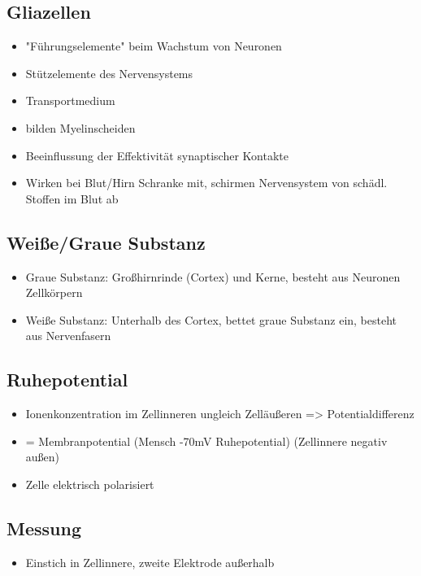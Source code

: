 \documentclass[a4paper,10pt,oneside]{article}
\begin{document}
\subsection{Gliazellen}
\begin{itemize}
	\item "Führungselemente" beim Wachstum von Neuronen
	\item Stützelemente des Nervensystems
	\item Transportmedium 
	\item bilden Myelinscheiden
	\item Beeinflussung der Effektivität synaptischer Kontakte
	\item Wirken bei Blut/Hirn Schranke mit, schirmen Nervensystem von schädl. Stoffen im Blut ab
\end{itemize}

\subsection{Weiße/Graue Substanz}
\begin{itemize}
	\item Graue Substanz: Großhirnrinde (Cortex) und Kerne, besteht aus Neuronen Zellkörpern
	\item Weiße Substanz: Unterhalb des Cortex, bettet graue Substanz ein, besteht aus Nervenfasern
\end{itemize}


\subsection{Ruhepotential}
\begin{itemize}
	\item Ionenkonzentration im Zellinneren ungleich Zelläußeren => Potentialdifferenz
	\item = Membranpotential (Mensch -70mV Ruhepotential) (Zellinnere negativ außen)
	\item Zelle elektrisch polarisiert
	
\end{itemize}



\subsection{Messung}
\begin{itemize}
	\item Einstich in Zellinnere, zweite Elektrode außerhalb
\end{itemize}
\end{document}
